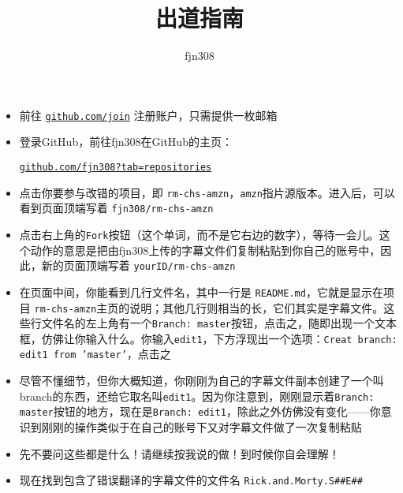\documentclass{ctexart}
\title{出道指南}
\author{fjn308}
\date{}
\begin{document}
\maketitle

\begin{itemize}
    \item 前往 \href{https://github.com/join}{\texttt{github.com/join}} 注册账户，只需提供一枚邮箱
    \item 登录GitHub，前往fjn308在GitHub的主页：
    
    \href{https://github.com/fjn308?tab=repositories}{\texttt{github.com/fjn308?tab=repositories}}
    \item 点击你要参与改错的项目，即{\color{blue} \texttt{rm-chs-amzn}}，\texttt{amzn}指片源版本。进入后，可以看到页面顶端写着{\color{blue} \texttt{fjn308/rm-chs-amzn}}
    \item 点击右上角的\texttt{Fork}按钮（这个单词，而不是它右边的数字），等待一会儿。这个动作的意思是把由fjn308上传的字幕文件们复制粘贴到你自己的账号中，因此，新的页面顶端写着{\color{blue} \texttt{yourID/rm-chs-amzn}}
    \item 在页面中间，你能看到几行文件名，其中一行是{\color{blue} \texttt{README.md}}，它就是显示在项目{\color{blue} \texttt{rm-chs-amzn}}主页的说明；其他几行则相当的长，它们其实是字幕文件。这些行文件名的左上角有一个\texttt{Branch: master}按钮，点击之，随即出现一个文本框，仿佛让你输入什么。你输入\texttt{edit1}，下方浮现出一个选项：\texttt{Creat branch: edit1 from 'master'}，点击之
    \item 尽管不懂细节，但你大概知道，你刚刚为自己的字幕文件副本创建了一个叫branch的东西，还给它取名叫\texttt{edit1}。因为你注意到，刚刚显示着\texttt{Branch: master}按钮的地方，现在是\texttt{Branch: edit1}，除此之外仿佛没有变化——你意识到刚刚的操作类似于在自己的账号下又对字幕文件做了一次复制粘贴
    \item 先不要问这些都是什么！请继续按我说的做！到时候你自会理解！
    \item 现在找到包含了错误翻译的字幕文件的文件名{\color{blue} \texttt{Rick.and.Morty.S\#\#E\#\#}}
    

\end{itemize}
\end{document}
